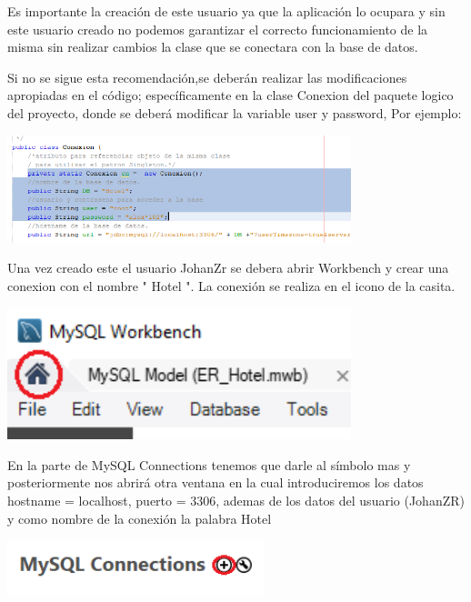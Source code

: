 \documentclass[12pt]{article}
\begin{document}
\begin{flushleft}
\textsf{Es importante la creación de este usuario ya que la aplicación lo ocupara y sin este usuario creado no podemos garantizar el correcto funcionamiento de la misma sin realizar cambios la clase que se conectara con la base de datos.}


\vspace{0.5cm}
\textsf{Si no se sigue esta recomendación,se deberán realizar las modificaciones apropiadas en el código; específicamente en la clase Conexion del paquete logico del proyecto, donde se deberá modificar la variable user y password, Por ejemplo:  }

\vspace{0.5cm}
\begin{center}
\includegraphics[width=10cm]{cambio.png}
\end{center}

\vspace{0.5cm}
\textsf{Una vez creado este el usuario JohanZr se debera abrir Workbench y crear una conexion con el nombre " Hotel ". La conexión se realiza  en el icono de la casita.}

\vspace{0.5cm}
\begin{center}
\includegraphics[width=10cm]{icono.png}
\end{center}

\vspace{0.5cm}
\textsf{En la parte de MySQL Connections tenemos que darle al símbolo mas y posteriormente nos abrirá otra ventana en la cual introduciremos los datos hostname =  localhost, puerto = 3306, ademas de los datos del usuario (JohanZR) y como nombre de la conexión la palabra Hotel}

\vspace{0.5cm}
\begin{center}
\includegraphics[width=7.5cm]{connection.png}
\end{center}


\end{flushleft}
\end{document}

